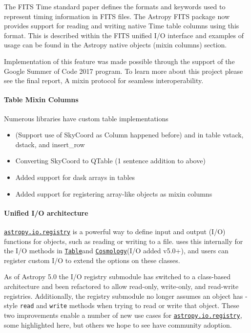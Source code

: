 \documentclass[modern]{aastex631}
\newcommand{\astropyiosubpkg}[1]{\href{http://docs.astropy.org/en/stable/io/#1/index.html}{\texttt{astropy.io.#1}}\xspace}
\newcommand{\astropyapi}[2]{\href{https://docs.astropy.org/en/stable/api/astropy.#1.html}{#2}}
\newcommand{\astropyapidoc}[2]{\astropyapi{#1}{\texttt{#2}\xspace}}
\newcommand{\astropyCosmology}{\astropyapidoc{cosmology.Cosmology}{Cosmology}}
\newcommand{\astropyTable}{\astropyapidoc{table.Table}{Table}}
\begin{document}
    The FITS Time standard paper defines the formats and keywords used to
    represent timing information in FITS files. The Astropy FITS package now
    provides support for reading and writing native Time table columns using
    this format. This is described within the FITS unified I/O interface and
    examples of usage can be found in the Astropy native objects (mixin columns)
    section.

    Implementation of this feature was made possible through the support of the
    Google Summer of Code 2017 program. To learn more about this project please
    see the final report, A mixin protocol for seamless interoperability.

  \paragraph{Table Mixin Columns}

    Numerous \python libraries have custom table implementations
    \begin{itemize}
      \item (Support use of SkyCoord as Column happened before) and in table vstack, dstack, and insert\_row
      \item Converting SkyCoord to QTable (1 sentence addition to above)
      \item Added support for dask arrays in tables
      \item Added support for registering array-like objects as mixin columns
    \end{itemize}

  \paragraph{Unified I/O architecture}

    \astropyiosubpkg{registry} is a powerful way to define input and output
    (I/O) functions for \astropypkg objects, such as reading or writing to a
    file. \astropy uses this internally for the I/O methods in \astropyTable and
    \astropyCosmology (I/O added v5.0+), and users can register custom I/O to
    extend the options on these classes.

    As of Astropy 5.0 the I/O registry submodule has switched to a class-based
    architecture and been refactored to allow read-only, write-only, and
    read-write registries. Additionally, the registry submodule no longer
    assumes an object has \astropy-style \texttt{read} and \texttt{write}
    methods when trying to read or write that object. These two improvements
    enable a number of new use cases for \astropyiosubpkg{registry}, some
    highlighted here, but others we hope to see have community adoption.
\end{document}
